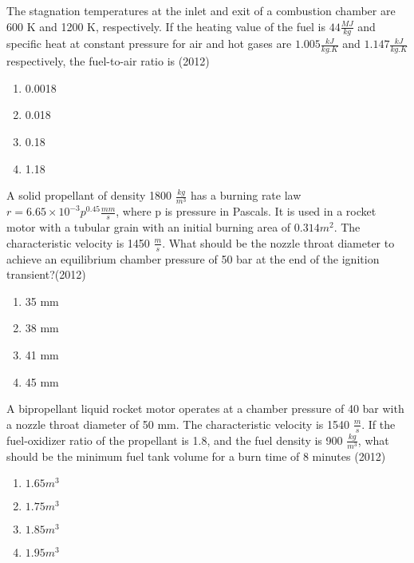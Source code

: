 
\iffalse
\chapter{2012}
\author{AI24BTECH11008}
\section{ae}
\fi

    \item The stagnation temperatures at the inlet and exit of a combustion chamber are 600 K and 1200 K,
    respectively. If the heating value of the fuel is $44 \frac{MJ}{kg}$ and specific heat at constant pressure for
    air and hot gases are $1.005\frac{kJ}{kg.K}$ and $1.147\frac{kJ}{kg.K}$ respectively, the fuel-to-air ratio is  \hfill (2012)
    \begin{enumerate}[label=(\Alph*)]
        \item 0.0018
        \item 0.018
        \item 0.18
        \item 1.18
    \end{enumerate}
    \item A solid propellant of density 1800 $\frac{kg}{m^3}$ has a burning rate law $r = 6.65 \times 10^{-3}p^{0.45} \frac{mm}{s}$, where p is pressure in Pascals. It is used in a rocket motor with a tubular grain with an initial burning area of $0.314 m^2$. The characteristic velocity is 1450 $\frac{m}{s}$. What should be the nozzle throat diameter to achieve an equilibrium chamber pressure of 50 bar at the end of the ignition transient?\hfill (2012)
    \begin{enumerate}[label=(\Alph*)]
        \item 35 mm
        \item 38 mm
        \item 41 mm
        \item 45 mm
    \end{enumerate}
    \item A bipropellant liquid rocket motor operates at a chamber pressure of 40 bar with a nozzle throat
    diameter of 50 mm. The characteristic velocity is 1540 $\frac{m}{s}$. If the fuel-oxidizer ratio of the
    propellant is 1.8, and the fuel density is 900 $\frac{kg}{m^3}$, what should be the minimum fuel tank volume
    for a burn time of 8 minutes \hfill (2012)
    \begin{enumerate}[label=(\Alph*)]
        \item $1.65m^3$
        \item $1.75m^3$
        \item $1.85m^3$
        \item $1.95m^3$
    \end{enumerate}
